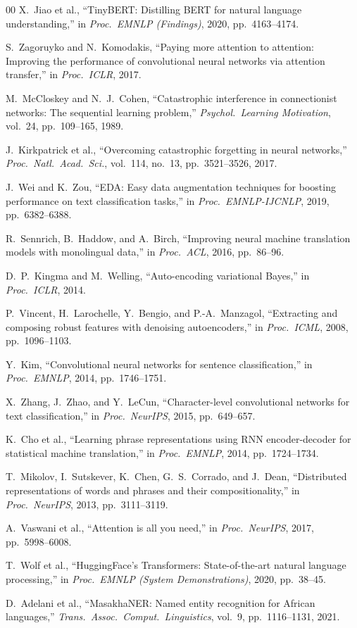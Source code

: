 \documentclass[conference]{IEEEtran}
\begin{document}
\begin{thebibliography}{00}
X.\ Jiao et al.,
``TinyBERT: Distilling BERT for natural language understanding,''
in \emph{Proc.\ EMNLP (Findings)}, 2020, pp.\ 4163--4174.

S.\ Zagoruyko and N.\ Komodakis,
``Paying more attention to attention: Improving the performance of
convolutional neural networks via attention transfer,''
in \emph{Proc.\ ICLR}, 2017.

M.\ McCloskey and N.\ J.\ Cohen,
``Catastrophic interference in connectionist networks: The sequential
learning problem,''
\emph{Psychol.\ Learning Motivation}, vol.\ 24, pp.\ 109--165, 1989.

J.\ Kirkpatrick et al.,
``Overcoming catastrophic forgetting in neural networks,''
\emph{Proc.\ Natl.\ Acad.\ Sci.}, vol.\ 114, no.\ 13,
pp.\ 3521--3526, 2017.

J.\ Wei and K.\ Zou,
``EDA: Easy data augmentation techniques for boosting performance on
text classification tasks,''
in \emph{Proc.\ EMNLP-IJCNLP}, 2019, pp.\ 6382--6388.

R.\ Sennrich, B.\ Haddow, and A.\ Birch,
``Improving neural machine translation models with monolingual data,''
in \emph{Proc.\ ACL}, 2016, pp.\ 86--96.

D.\ P.\ Kingma and M.\ Welling,
``Auto-encoding variational Bayes,''
in \emph{Proc.\ ICLR}, 2014.

P.\ Vincent, H.\ Larochelle, Y.\ Bengio, and P.-A.\ Manzagol,
``Extracting and composing robust features with denoising autoencoders,''
in \emph{Proc.\ ICML}, 2008, pp.\ 1096--1103.

Y.\ Kim,
``Convolutional neural networks for sentence classification,''
in \emph{Proc.\ EMNLP}, 2014, pp.\ 1746--1751.

X.\ Zhang, J.\ Zhao, and Y.\ LeCun,
``Character-level convolutional networks for text classification,''
in \emph{Proc.\ NeurIPS}, 2015, pp.\ 649--657.

K.\ Cho et al.,
``Learning phrase representations using RNN encoder-decoder for
statistical machine translation,''
in \emph{Proc.\ EMNLP}, 2014, pp.\ 1724--1734.

T.\ Mikolov, I.\ Sutskever, K.\ Chen, G.\ S.\ Corrado, and J.\ Dean,
``Distributed representations of words and phrases and their
compositionality,''
in \emph{Proc.\ NeurIPS}, 2013, pp.\ 3111--3119.

A.\ Vaswani et al.,
``Attention is all you need,''
in \emph{Proc.\ NeurIPS}, 2017, pp.\ 5998--6008.

T.\ Wolf et al.,
``HuggingFace's Transformers: State-of-the-art natural language processing,''
in \emph{Proc.\ EMNLP (System Demonstrations)}, 2020, pp.\ 38--45.

D.\ Adelani et al.,
``MasakhaNER: Named entity recognition for African languages,''
\emph{Trans.\ Assoc.\ Comput.\ Linguistics}, vol.\ 9,
pp.\ 1116--1131, 2021.

\end{thebibliography}
\end{document}
